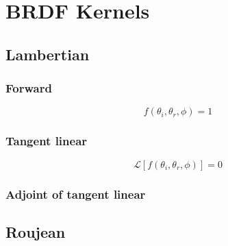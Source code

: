 %
\section{BRDF Kernels}
\label{sec:brdf_kernels}


%
\subsection{Lambertian}
\label{sec:brdf_kernels-lambertian}

\subsubsection{Forward}
\label{sec:brdf_kernels-lambertian-forward}

\begin{equation}
f(\theta_{i}, \theta_{r}, \phi) = 1
\label{eq:brdf_kernels-lambertian-forward-f}
\end{equation}


\subsubsection{Tangent linear}
\label{sec:brdf_kernels-lambertian-tangent_linear}

\begin{equation}
\mathcal{L}\left[f(\theta_{i}, \theta_{r}, \phi)\right] = 0
\label{eq:brdf_kernels-lambertian-tangent_linear-f}
\end{equation}


\subsubsection{Adjoint of tangent linear}
\label{sec:brdf_kernels-lambertian-adjoint_of_tangent_linear}


%
\subsection{Roujean}
\label{sec:brdf_kernels-roujean}

